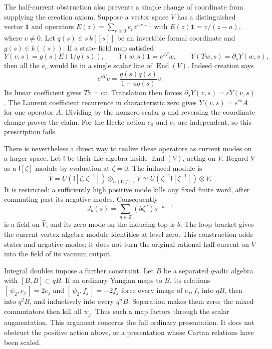 The half-current obstruction also prevents a simple change of
coordinate from supplying the creation axiom.
Suppose a vector space \(V\) has a distinguished vector \(\mathbf1\)
and operators \(E(z)=\sum_{r\geq0}e_rz^{-r-1}\) with
\(E(z)\mathbf1=v/(z-a)\), where \(v\ne0\).
Let \(q(s)\in s\,k[[s]]\) be an invertible formal coordinate
and \(g(s)\in k((s))\).
If a state--field map satisfied
\[
 Y(v,s)=g(s)E(1/q(s)),\qquad
 Y(w,s)\mathbf1=e^{sT}w,\qquad Y(Tw,s)=\partial_sY(w,s),
\]
then all the \(e_r\) would lie in a single scalar line of
\(\operatorname{End}(V)\).
Indeed creation says
\[
 e^{sT}v=\frac{g(s)q(s)}{1-aq(s)}v.
\]
Its linear coefficient gives \(Tv=cv\).
Translation then forces
\(\partial_sY(v,s)=cY(v,s)\).
The Laurent coefficient recurrence in characteristic zero gives
\(Y(v,s)=e^{cs}A\) for one operator \(A\).
Dividing by the nonzero scalar \(g\) and reversing the coordinate
change proves the claim.
For the Hecke action \(e_0\) and \(e_1\) are independent, so this
prescription fails.

There is nevertheless a direct way to realize these operators as
current modes on a larger space. Let \(\mathfrak l\) be their Lie
algebra inside \(\operatorname{End}(V)\), acting on \(V\).
Regard \(V\) as a \(\mathfrak l[\zeta]\)-module by evaluation
at \(\zeta=0\). The induced module is
\[
 \widehat V=
 U(\mathfrak l[\zeta,\zeta^{-1}])
       \otimes_{U(\mathfrak l[\zeta])}V
 \simeq U(\zeta^{-1}\mathfrak l[\zeta^{-1}])\otimes V.
\]
It is restricted: a sufficiently high positive mode kills any
fixed finite word, after commuting past its negative modes.
Consequently
\[
 J_b(s)=\sum_{n\in\mathbb Z}(b\zeta^n)s^{-n-1}
\]
is a field on \(\widehat V\), and its zero mode on the inducing top
is \(b\). The loop bracket gives the current vertex-algebra module
identities at level zero. This construction adds states and negative
modes; it does not turn the original rational half-current on \(V\)
into the field of its vacuum output.

Integral doubles impose a further constraint. Let \(B\) be a
separated \(q\)-adic algebra with
\([B,B]\subset qB\).
If an ordinary Yangian maps to \(B\), its relations
\([\,\psi_2,e_j\,]=2e_j\) and
\([\,\psi_2,f_j\,]=-2f_j\) force every image of \(e_j,f_j\)
into \(qB\), then into \(q^2B\), and inductively into every \(q^nB\).
Separation makes them zero; the mixed commutators then kill all
\(\psi_j\). Thus such a map factors through the scalar augmentation.
This argument concerns the full ordinary presentation.
It does not obstruct the positive action above, or a presentation
whose Cartan relations have been scaled.

